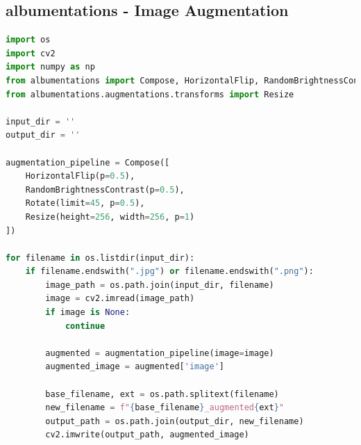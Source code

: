 \newpage

\subsection{albumentations - Image Augmentation}
\begin{lstlisting}[language=Python]
import os
import cv2
import numpy as np
from albumentations import Compose, HorizontalFlip, RandomBrightnessContrast, Rotate
from albumentations.augmentations.transforms import Resize

input_dir = ''
output_dir = ''

augmentation_pipeline = Compose([
    HorizontalFlip(p=0.5),
    RandomBrightnessContrast(p=0.5),
    Rotate(limit=45, p=0.5),
    Resize(height=256, width=256, p=1)
])

for filename in os.listdir(input_dir):
    if filename.endswith(".jpg") or filename.endswith(".png"):
        image_path = os.path.join(input_dir, filename)
        image = cv2.imread(image_path)
        if image is None:
            continue

        augmented = augmentation_pipeline(image=image)
        augmented_image = augmented['image']

        base_filename, ext = os.path.splitext(filename)
        new_filename = f"{base_filename}_augmented{ext}"
        output_path = os.path.join(output_dir, new_filename)
        cv2.imwrite(output_path, augmented_image)
\end{lstlisting}

